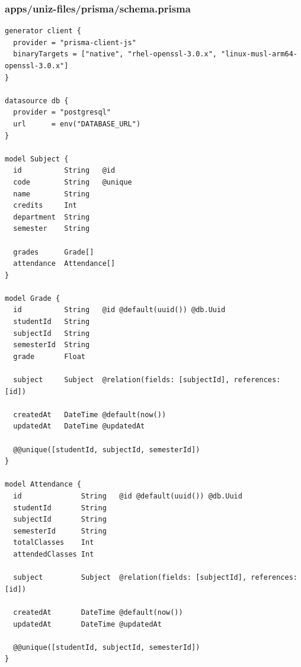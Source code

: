 \documentclass[11pt,a4paper,oneside]{article}
\begin{document}
\subsubsection*{apps/uniz-files/prisma/schema.prisma}
\begin{lstlisting}
generator client {
  provider = "prisma-client-js"
  binaryTargets = ["native", "rhel-openssl-3.0.x", "linux-musl-arm64-openssl-3.0.x"]
}

datasource db {
  provider = "postgresql"
  url      = env("DATABASE_URL")
}

model Subject {
  id          String   @id
  code        String   @unique
  name        String
  credits     Int
  department  String
  semester    String
  
  grades      Grade[]
  attendance  Attendance[]
}

model Grade {
  id          String   @id @default(uuid()) @db.Uuid
  studentId   String
  subjectId   String
  semesterId  String
  grade       Float
  
  subject     Subject  @relation(fields: [subjectId], references: [id])
  
  createdAt   DateTime @default(now())
  updatedAt   DateTime @updatedAt

  @@unique([studentId, subjectId, semesterId])
}

model Attendance {
  id              String   @id @default(uuid()) @db.Uuid
  studentId       String
  subjectId       String
  semesterId      String
  totalClasses    Int
  attendedClasses Int
  
  subject         Subject  @relation(fields: [subjectId], references: [id])
  
  createdAt       DateTime @default(now())
  updatedAt       DateTime @updatedAt

  @@unique([studentId, subjectId, semesterId])
}

\end{lstlisting}
\end{document}
